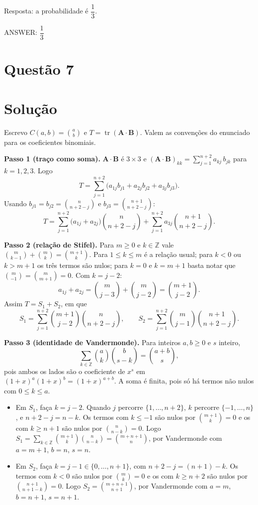 \documentclass{article}%
\begin{document}
Resposta: a probabilidade é $\dfrac{1}{3}$.

ANSWER: $\dfrac{1}{3}$%
\newpage%
\section*{Questão 7}

\section*{Solução}

Escrevo $C(a,b)=\binom{a}{b}$ e $T=\operatorname{tr}(\mathbf{A}\cdot\mathbf{B})$. Valem as convenções do enunciado para os coeficientes binomiais.

\textbf{Passo 1 (traço como soma).} $\mathbf{A}\cdot\mathbf{B}$ é $3\times 3$ e $(\mathbf{A}\cdot\mathbf{B})_{kk}=\sum_{j=1}^{n+2}a_{kj}\,b_{jk}$ para $k=1,2,3$. Logo
\[
T=\sum_{j=1}^{n+2}\bigl(a_{1j}b_{j1}+a_{2j}b_{j2}+a_{3j}b_{j3}\bigr).
\]
Usando $b_{j1}=b_{j2}=\binom{n}{n+2-j}$ e $b_{j3}=\binom{n+1}{n+2-j}$:
\[
T=\sum_{j=1}^{n+2}\bigl(a_{1j}+a_{2j}\bigr)\binom{n}{n+2-j}+\sum_{j=1}^{n+2}a_{3j}\binom{n+1}{n+2-j}.
\]

\textbf{Passo 2 (relação de Stifel).} Para $m\ge 0$ e $k\in\mathbb{Z}$ vale $\binom{m}{k-1}+\binom{m}{k}=\binom{m+1}{k}$. Para $1\le k\le m$ é a relação usual; para $k<0$ ou $k>m+1$ os três termos são nulos; para $k=0$ e $k=m+1$ basta notar que $\binom{m}{-1}=\binom{m}{m+1}=0$. Com $k=j-2$:
\[
a_{1j}+a_{2j}=\binom{m}{j-3}+\binom{m}{j-2}=\binom{m+1}{j-2}.
\]
Assim $T=S_1+S_2$, em que
\[
S_1=\sum_{j=1}^{n+2}\binom{m+1}{j-2}\binom{n}{n+2-j},\qquad S_2=\sum_{j=1}^{n+2}\binom{m}{j-1}\binom{n+1}{n+2-j}.
\]

\textbf{Passo 3 (identidade de Vandermonde).} Para inteiros $a,b\ge 0$ e $s$ inteiro,
\[
\sum_{k\in\mathbb{Z}}\binom{a}{k}\binom{b}{s-k}=\binom{a+b}{s},
\]
pois ambos os lados são o coeficiente de $x^s$ em $(1+x)^a(1+x)^b=(1+x)^{a+b}$. A soma é finita, pois só há termos não nulos com $0\le k\le a$.

\begin{itemize}
\item Em $S_1$, faça $k=j-2$. Quando $j$ percorre $\{1,\ldots,n+2\}$, $k$ percorre $\{-1,\ldots,n\}$, e $n+2-j=n-k$. Os termos com $k\le -1$ são nulos por $\binom{m+1}{k}=0$ e os com $k\ge n+1$ são nulos por $\binom{n}{n-k}=0$. Logo $S_1=\sum_{k\in\mathbb{Z}}\binom{m+1}{k}\binom{n}{n-k}=\binom{m+n+1}{n}$, por Vandermonde com $a=m+1$, $b=n$, $s=n$.
\item Em $S_2$, faça $k=j-1\in\{0,\ldots,n+1\}$, com $n+2-j=(n+1)-k$. Os termos com $k<0$ são nulos por $\binom{m}{k}=0$ e os com $k\ge n+2$ são nulos por $\binom{n+1}{n+1-k}=0$. Logo $S_2=\binom{m+n+1}{n+1}$, por Vandermonde com $a=m$, $b=n+1$, $s=n+1$.
\end{itemize}
\end{document}
